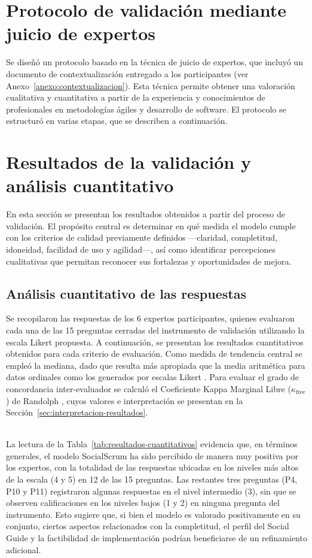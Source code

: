 \section{Protocolo de validación mediante juicio de expertos}
Se diseñó un protocolo basado en la técnica de juicio de expertos, que incluyó un documento de contextualización entregado a los participantes (ver Anexo~\ref{anexo:contextualizacion}). Esta técnica permite obtener una valoración cualitativa y cuantitativa a partir de la experiencia y conocimientos de profesionales en metodologías ágiles y desarrollo de software. El protocolo se estructuró en varias etapas, que se describen a continuación.

\section{Resultados de la validación y análisis cuantitativo}
En esta sección se presentan los resultados obtenidos a partir del proceso de validación. El propósito central es determinar en qué medida el modelo cumple con los criterios de calidad previamente definidos ---claridad, completitud, idoneidad, facilidad de uso y agilidad---, así como identificar percepciones cualitativas que permitan reconocer sus fortalezas y oportunidades de mejora.

\subsection{Análisis cuantitativo de las respuestas}
Se recopilaron las respuestas de los 6 expertos participantes, quienes evaluaron cada una de las 15 preguntas cerradas del instrumento de validación utilizando la escala Likert propuesta. A continuación, se presentan los resultados cuantitativos obtenidos para cada criterio de evaluación. Como medida de tendencia central se empleó la mediana, dado que resulta más apropiada que la media aritmética para datos ordinales como los generados por escalas Likert \cite{jamieson2004}. Para evaluar el grado de concordancia inter-evaluador se calculó el Coeficiente Kappa Marginal Libre ($\kappa_{\text{free}}$) de Randolph \cite{randolph2005}, cuyos valores e interpretación se presentan en la Sección~\ref{sec:interpretacion-resultados}.

\mbox{}\\[-0.1\baselineskip]
La lectura de la Tabla~\ref{tab:resultados-cuantitativos} evidencia que, en términos generales, el modelo SocialScrum ha sido percibido de manera muy positiva por los expertos, con la totalidad de las respuestas ubicadas en los niveles más altos de la escala (4 y 5) en 12 de las 15 preguntas. Las restantes tres preguntas (P4, P10 y P11) registraron algunas respuestas en el nivel intermedio (3), sin que se observen calificaciones en los niveles bajos (1 y 2) en ninguna pregunta del instrumento. Esto sugiere que, si bien el modelo es valorado positivamente en su conjunto, ciertos aspectos relacionados con la completitud, el perfil del Social Guide y la factibilidad de implementación podrían beneficiarse de un refinamiento adicional.

